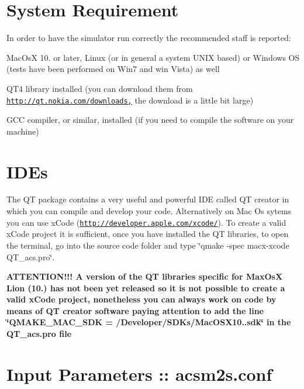 \par
\par
 \hypertarget{intro_sysreq}{}\section{System Requirement}\label{intro_sysreq}


 In order to have the simulator run correctly the recommended staff is reported\-:
\begin{DoxyItemize}
\item Mac\-Os\-X 10. or later, Linux (or in general a system U\-N\-I\-X based) or Windows O\-S (tests have been performed on Win7 and win Vista) as well
\item Q\-T4 library installed (you can download them from \href{http://qt.nokia.com/downloads,}{\tt http\-://qt.\-nokia.\-com/downloads,} the download is a little bit large)
\item G\-C\-C compiler, or similar, installed (if you need to compile the software on your machine) \par
\par
 
\end{DoxyItemize}\hypertarget{intro_ide}{}\section{I\-D\-Es}\label{intro_ide}


 The Q\-T package contains a very useful and powerful I\-D\-E called Q\-T creator in which you can compile and develop your code. Alternatively on Mac Os sytems you can use x\-Code (\href{http://developer.apple.com/xcode/}{\tt http\-://developer.\-apple.\-com/xcode/}). To create a valid x\-Code project it is sufficient, once you have installed the Q\-T libraries, to open the terminal, go into the source code folder and type \char`\"{}qmake -\/spec macx-\/xcode Q\-T\-\_\-acs.\-pro\char`\"{}.\par
 {\bfseries A\-T\-T\-E\-N\-T\-I\-O\-N!!! A version of the Q\-T libraries specific for Max\-Os\-X Lion (10.) has not been yet released so it is not possible to create a valid x\-Code project, nonetheless you can always work on code by means of Q\-T creator software paying attention to add the line \char`\"{}\-Q\-M\-A\-K\-E\-\_\-\-M\-A\-C\-\_\-\-S\-D\-K = /\-Developer/\-S\-D\-Ks/\-Mac\-O\-S\-X10..\-sdk\char`\"{} in the Q\-T\-\_\-acs.\-pro file} \par
\par
 \hypertarget{intro_parameters}{}\section{Input Parameters \-:: acsm2s.\-conf}\label{intro_parameters}


